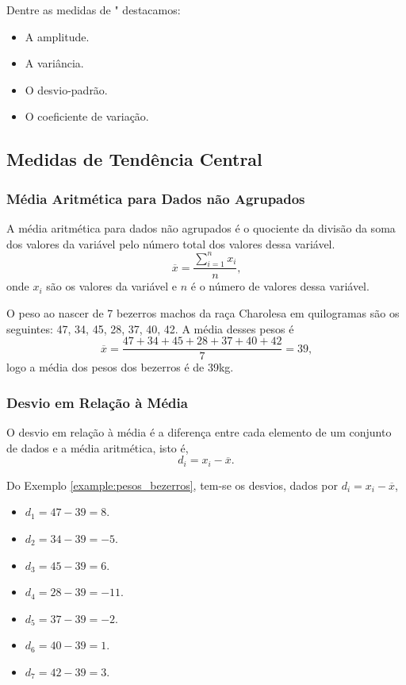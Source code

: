 \documentclass[11pt,fleqn]{book}
\numberwithin{mpicture}{chapter}
\numberwithin{mtable}{chapter}
\numberwithin{mframe}{chapter}
\begin{document}
Dentre as medidas de " destacamos:
\begin{itemize}
	\item A amplitude.
	\item A variância.
	\item O desvio-padrão.
	\item O coeficiente de variação.
\end{itemize}

\subsection{Medidas de Tendência Central}

\subsubsection{Média Aritmética para Dados não Agrupados}

A média aritmética para dados não agrupados é o quociente da divisão da soma dos valores da variável pelo número total dos valores dessa variável.
\[
	\overline{x} = \frac{\displaystyle\sum_{i=1}^{n} x_i}{n}
	\text{,}
\]
onde $x_i$ são os valores da variável e $n$ é o número de valores dessa variável.

\begin{example}
	\label{example:pesos_bezerros}
	O peso ao nascer de 7 bezerros machos da raça Charolesa em quilogramas são os seguintes: 47, 34, 45, 28, 37, 40, 42. A média desses pesos é
	\[
		\overline{x}=\frac{47+34+45+28+37+40+42}{7}=39\text{,}
	\]
	logo a média dos pesos dos bezerros é de 39kg.
\end{example}

\subsubsection{Desvio em Relação à Média}

O desvio em relação à média é a diferença entre cada elemento de um conjunto de dados e a média aritmética, isto é,
\[
	d_i=x_i-\overline{x}\text{.}
\]

\begin{example}
	\label{example:pesos_bezerros_desvios}
	Do Exemplo \ref{example:pesos_bezerros}, tem-se os desvios, dados por $d_i=x_i-\overline{x}$,
	\begin{itemize}
		\item $d_1=47-39=8$.
		\item $d_2=34-39=-5$.
		\item $d_3=45-39=6$.
		\item $d_4=28-39=-11$.
		\item $d_5=37-39=-2$.
		\item $d_6=40-39=1$.
		\item $d_7=42-39=3$.
	\end{itemize}
\end{example}
\end{document}
